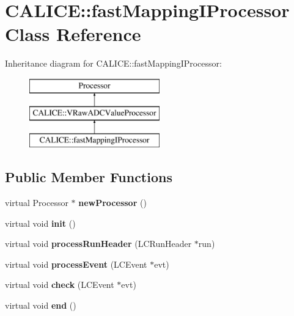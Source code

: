 \section{C\-A\-L\-I\-C\-E\-:\-:fast\-Mapping\-I\-Processor Class Reference}
\label{classCALICE_1_1fastMappingIProcessor}
Inheritance diagram for C\-A\-L\-I\-C\-E\-:\-:fast\-Mapping\-I\-Processor\-:\begin{figure}[H]
\begin{center}
\leavevmode
\includegraphics[height=3.000000cm]{classCALICE_1_1fastMappingIProcessor}
\end{center}
\end{figure}
\subsection*{Public Member Functions}
\begin{DoxyCompactItemize}
\item 
virtual Processor $\ast$ {\bfseries new\-Processor} ()\label{classCALICE_1_1fastMappingIProcessor_afd4a773dc4a748fd0b0f158145633c1e}

\item 
virtual void {\bfseries init} ()\label{classCALICE_1_1fastMappingIProcessor_a793005abfe7163deb7e8b358f8ba0b1c}

\item 
virtual void {\bfseries process\-Run\-Header} (L\-C\-Run\-Header $\ast$run)\label{classCALICE_1_1fastMappingIProcessor_a8b6727abbeb2da17115f390a0a98ad27}

\item 
virtual void {\bfseries process\-Event} (L\-C\-Event $\ast$evt)\label{classCALICE_1_1fastMappingIProcessor_a1a148ed309dc4126bebefd8b665e99da}

\item 
virtual void {\bfseries check} (L\-C\-Event $\ast$evt)\label{classCALICE_1_1fastMappingIProcessor_a29d4f13330cd1f1a81348412eb9f019f}

\item 
virtual void {\bfseries end} ()\label{classCALICE_1_1fastMappingIProcessor_a68fd91bd4b382f7edf96c209be10afc3}

\end{DoxyCompactItemize}
